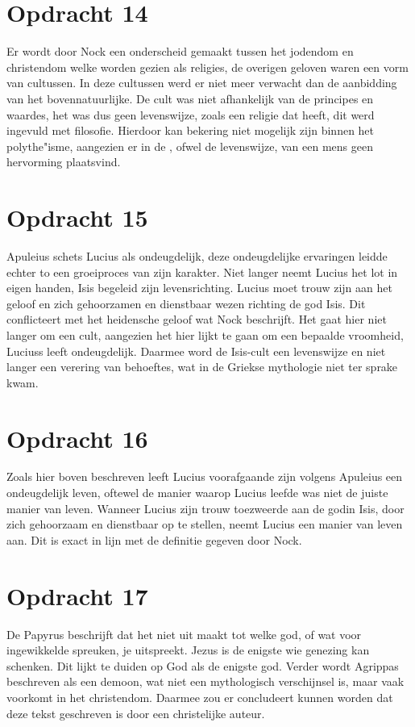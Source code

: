 \documentclass[10pt]{amsart}
\begin{document}
\section*{Opdracht 14}
Er wordt door Nock een onderscheid gemaakt tussen het jodendom en christendom welke worden gezien als religies, de overigen geloven waren een vorm van cultussen. In deze cultussen werd er niet meer verwacht dan de aanbidding van het bovennatuurlijke. De cult was niet afhankelijk van de principes en waardes, het was dus geen levenswijze, zoals een religie dat heeft, dit werd ingevuld met filosofie. Hierdoor kan bekering niet mogelijk zijn binnen het polythe"isme, aangezien er in de , ofwel de levenswijze, van een mens geen hervorming plaatsvind.\autocite{nockConversionOldNew1933}

\section*{Opdracht 15}
Apuleius schets Lucius als ondeugdelijk, deze ondeugdelijke ervaringen leidde echter to een groeiproces van zijn karakter. Niet langer neemt Lucius het lot in eigen handen, Isis begeleid zijn levensrichting. Lucius moet trouw zijn aan het geloof en zich gehoorzamen en dienstbaar wezen richting de god Isis.\autocite{apuleiusMetamorphosesa} Dit conflicteert met het heidensche geloof wat Nock beschrijft. Het gaat hier niet langer om een cult, aangezien het hier lijkt te gaan om een bepaalde vroomheid, Luciuss leeft
ondeugdelijk. Daarmee word de Isis-cult een levenswijze en niet langer een verering van behoeftes, wat in de Griekse mythologie niet ter sprake kwam.

\section*{Opdracht 16}
Zoals hier boven beschreven leeft Lucius voorafgaande zijn  volgens Apuleius een ondeugdelijk leven, oftewel de manier waarop Lucius leefde was niet de juiste manier van leven. Wanneer Lucius zijn trouw toezweerde aan de godin Isis, door zich gehoorzaam en dienstbaar op te stellen, neemt Lucius een  manier van leven aan. Dit is exact in lijn met de definitie gegeven door Nock.

\section*{Opdracht 17}
De Papyrus beschrijft dat het niet uit maakt tot welke god, of wat voor ingewikkelde spreuken, je uitspreekt. Jezus is de enigste wie genezing kan schenken. Dit lijkt te duiden op God als de enigste god. Verder wordt Agrippas beschreven als een demoon, wat niet een mythologisch verschijnsel is, maar vaak voorkomt in het christendom. Daarmee zou er concludeert kunnen worden dat deze tekst geschreven is door een christelijke auteur.

\newpage \printbibliography{}
\end{document}

